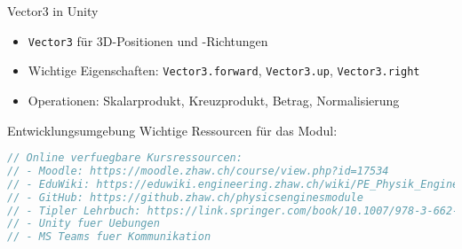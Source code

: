 \begin{definition}{Vector3 in Unity}
    \begin{itemize}
        \item \texttt{Vector3} für 3D-Positionen und -Richtungen
        \item Wichtige Eigenschaften: \texttt{Vector3.forward}, \texttt{Vector3.up}, \texttt{Vector3.right}
        \item Operationen: Skalarprodukt, Kreuzprodukt, Betrag, Normalisierung
    \end{itemize}
\end{definition}

\begin{code}{Entwicklungsumgebung}
    Wichtige Ressourcen für das Modul:
\begin{lstlisting}[language=C, style=basesmol]
// Online verfuegbare Kursressourcen:
// - Moodle: https://moodle.zhaw.ch/course/view.php?id=17534
// - EduWiki: https://eduwiki.engineering.zhaw.ch/wiki/PE_Physik_Engines
// - GitHub: https://github.zhaw.ch/physicsenginesmodule
// - Tipler Lehrbuch: https://link.springer.com/book/10.1007/978-3-662-58281-7
// - Unity fuer Uebungen
// - MS Teams fuer Kommunikation
\end{lstlisting}
\end{code}

